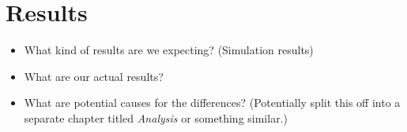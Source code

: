 \chapter{Results}
\label{ch:results}

\begin{itemize}\tightlist
    \item
        What kind of results are we expecting? (Simulation results)
    \item
        What are our actual results?
    \item
        What are potential causes for the differences? (Potentially split this off
        into a separate chapter titled \emph{Analysis} or something similar.)
\end{itemize}
